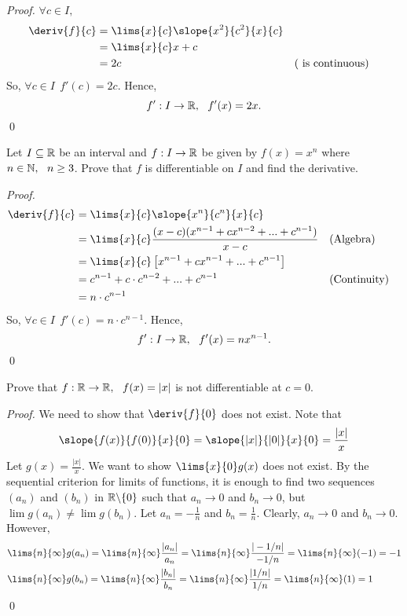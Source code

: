 \begin{proof}
    $\forall c \in I,$
    \begin{align*}
        \deriv{f}{c} &= \lims{x}{c} \slope{x^2}{c^2}{x}{c} \\
        &= \lims{x}{c} x + c \\
        &= 2c &&(\text{ is continuous})
    \end{align*}
    So, $\forall c \in I ~~f'(c) = 2c.$ Hence,
    $$f': I \to \mathbb{R}, ~~ f'(x) = 2x.$$
    \qed
\end{proof}

\begin{example}
    Let $I\subseteq \mathbb{R}$ be an interval and $f: I \to \mathbb{R}$ be given by $f(x) = x^n$ where $n\in \mathbb{N}, ~~n \geq 3$. Prove that $f$ is differentiable on $I$ and find the derivative.
\end{example}

\begin{proof}
    \begin{align*}
        \deriv{f}{c} &= \lims{x}{c} \slope{x^n}{c^n}{x}{c} \\
        &= \lims{x}{c} \frac{(x-c)(x^{n-1}+cx^{n-2}+...+c^{n-1})}{x-c} &&(\text{Algebra}) \\
        &= \lims{x}{c}\left[x^{n-1}+cx^{n-1}+...+c^{n-1}\right] \\
        &= c^{n-1} + c \cdot c^{n-2} + ... + c^{n-1} &&(\text{Continuity}) \\
        &= n \cdot c^{n-1}
    \end{align*}
    So, $\forall c \in I ~~f'(c) = n \cdot c^{n-1}$. Hence,
    $$f': I \to \mathbb{R}, ~~ f'(x) = nx^{n-1}.$$
    \qed
\end{proof}

\begin{example}
    Prove that $f: \mathbb{R} \to \mathbb{R}, ~~f(x) = |x|$ is not differentiable at $c = 0$.
\end{example}

\begin{proof}
    We need to show that $\deriv{f}{0}$ does not exist. Note that
    $$\slope{f(x)}{f(0)}{x}{0} = \slope{|x|}{|0|}{x}{0} = \frac{|x|}{x}$$
    Let $g(x) = \frac{|x|}{x}.$ We want to show $\lims{x}{0} g(x)$ does not exist. By the sequential criterion for limits of functions, it is enough to find two sequences $(a_n)$ and $(b_n)$ in $\mathbb{R} \backslash \{0\}$ such that $a_n \to 0$ and $b_n \to 0$, but $\lim g(a_n) \not = \lim g(b_n).$ Let $a_n = -\frac{1}{n}$ and $b_n = \frac{1}{n}$. Clearly, $a_n \to 0$ and $b_n \to 0$. However,
    \begin{align*}
        &\lims{n}{\infty}g(a_n) = \lims{n}{\infty}\frac{|a_n|}{a_n} = \lims{n}{\infty} \frac{|-1/n|}{-1/n} = \lims{n}{\infty}(-1) = -1 \\
        &\lims{n}{\infty}g(b_n) = \lims{n}{\infty}\frac{|b_n|}{b_n} = \lims{n}{\infty} \frac{|1/n|}{1/n} = \lims{n}{\infty}(1) = 1 
    \end{align*}
    \qed
\end{proof}

